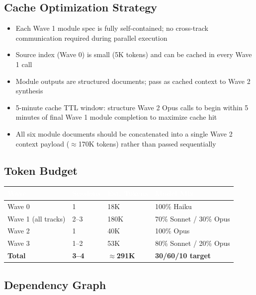 \documentclass[11pt,letterpaper]{article}
\newcommand{\tableheader}[1]{\textbf{\sffamily\textcolor{white}{#1}}}
\begin{document}
\subsection{Cache Optimization Strategy}

\begin{itemize}
  \item Each Wave 1 module spec is fully self-contained; no cross-track communication required during parallel execution
  \item Source index (Wave 0) is small (5K tokens) and can be cached in every Wave 1 call
  \item Module outputs are structured documents; pass as cached context to Wave 2 synthesis
  \item 5-minute cache TTL window: structure Wave 2 Opus calls to begin within 5 minutes of final Wave 1 module completion to maximize cache hit
  \item All six module documents should be concatenated into a single Wave 2 context payload ($\approx$170K tokens) rather than passed sequentially
\end{itemize}

\subsection{Token Budget}

\begin{center}
\begin{tabularx}{\textwidth}{L{3cm}C{2cm}C{2.5cm}C{2.5cm}}
\toprule
{}
\tableheader{Wave} & \tableheader{Sessions} & \tableheader{Est. Tokens} & \tableheader{Model Mix} \\
\midrule
Wave 0 & 1 & 18K & 100\% Haiku \\
Wave 1 (all tracks) & 2--3 & 180K & 70\% Sonnet / 30\% Opus \\
Wave 2 & 1 & 40K & 100\% Opus \\
Wave 3 & 1--2 & 53K & 80\% Sonnet / 20\% Opus \\
\midrule
\textbf{Total} & \textbf{3--4} & \textbf{$\approx$291K} & \textbf{30/60/10 target} \\
\bottomrule
\end{tabularx}
\end{center}

\subsection{Dependency Graph}
\end{document}
